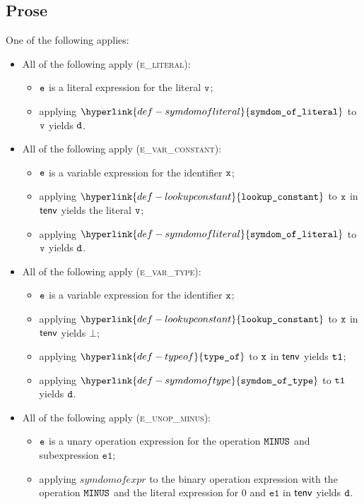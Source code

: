 \documentclass{book}
\newcommand\lookupconstant[0]{\hyperlink{def-lookupconstant}{\texttt{lookup\_constant}}}
\newcommand\typeof[0]{\hyperlink{def-typeof}{\texttt{type\_of}}}
\newcommand\symdomoftype[0]{\hyperlink{def-symdomoftype}{\texttt{symdom\_of\_type}}}
\newcommand\symdomofliteral[0]{\hyperlink{def-symdomofliteral}{\texttt{symdom\_of\_literal}}}
\newcommand\veone[0]{\texttt{e1}}
\begin{document}
\subsection{Prose}
One of the following applies:
\begin{itemize}
  \item All of the following apply (\textsc{e\_literal}):
  \begin{itemize}
    \item $\texttt{e}$ is a literal expression for the literal $\texttt{v}$;
    \item applying $\symdomofliteral$ to $\texttt{v}$ yields $\texttt{d}$.
  \end{itemize}

  \item All of the following apply (\textsc{e\_var\_constant}):
  \begin{itemize}
    \item $\texttt{e}$ is a variable expression for the identifier $\texttt{x}$;
    \item applying $\lookupconstant$ to $\texttt{x}$ in $\textsf{tenv}$ yields the literal $\texttt{v}$;
    \item applying $\symdomofliteral$ to $\texttt{v}$ yields $\texttt{d}$.
  \end{itemize}

  \item All of the following apply (\textsc{e\_var\_type}):
  \begin{itemize}
    \item $\texttt{e}$ is a variable expression for the identifier $\texttt{x}$;
    \item applying $\lookupconstant$ to $\texttt{x}$ in $\textsf{tenv}$ yields $\bot$;
    \item applying $\typeof$ to $\texttt{x}$ in $\textsf{tenv}$ yields $\texttt{t1}$;
    \item applying $\symdomoftype$ to $\texttt{t1}$ yields $\texttt{d}$.
  \end{itemize}

  \item All of the following apply (\textsc{e\_unop\_minus}):
  \begin{itemize}
    \item $\texttt{e}$ is a unary operation expression for the operation $\texttt{MINUS}$ and subexpression $\veone$;
    \item applying $symdomofexpr$ to the binary operation expression with the operation $\texttt{MINUS}$
          and the literal expression for $0$ and $\veone$ in $\textsf{tenv}$ yields $\texttt{d}$.
  \end{itemize}


\end{itemize}
\end{document}
